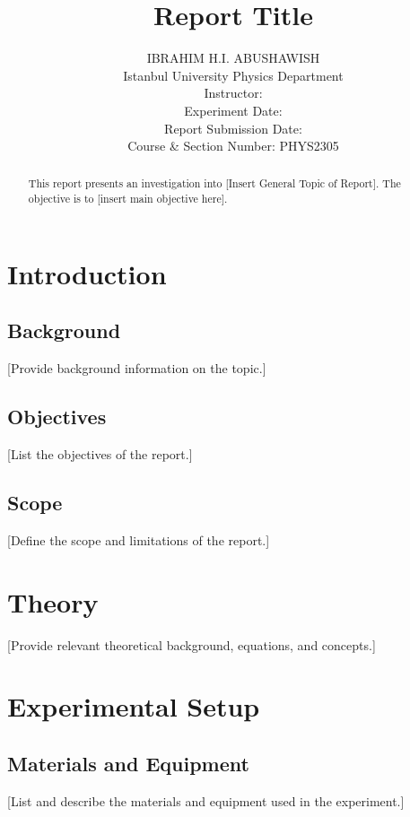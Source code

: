 \documentclass[journal]{IEEEtran}
\begin{document}
\title{Report Title}
\author{IBRAHIM H.I. ABUSHAWISH\\
Istanbul University Physics Department\\
Instructor: \\ 
Experiment Date: \\ Report Submission Date: \\ 
Course \& Section Number: PHYS2305}

\maketitle

\begin{abstract}
    This report presents an investigation into [Insert General Topic of Report]. The objective is to [insert main objective here].
\end{abstract}


\section{Introduction}
\subsection{Background}
[Provide background information on the topic.]

\subsection{Objectives}
[List the objectives of the report.]

\subsection{Scope}
[Define the scope and limitations of the report.]

\section{Theory}
[Provide relevant theoretical background, equations, and concepts.]

\section{Experimental Setup}
\subsection{Materials and Equipment}
[List and describe the materials and equipment used in the experiment.]
\end{document}

